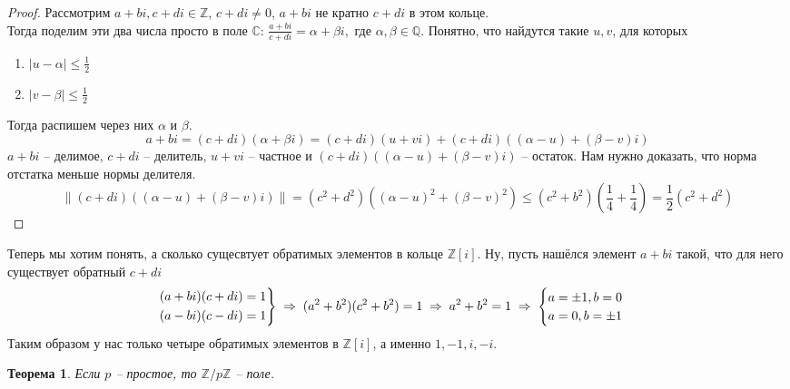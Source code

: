 \documentclass[12pt, a4paper]{article}
\newcommand{\qu}{\mathds{Q}}
\newcommand{\ra}{\;\Rightarrow\;}
\newcommand{\ce}{\mathds{C}}
\newcommand{\Z}{\mathds{Z}}
\newcommand{\m}{\leqslant}
\newcommand{\norm}[1]{\left \lVert #1 \right \rVert}
\theoremstyle{plain}
\newtheorem*{Th*}{Теорема}
\theoremstyle{definition}
\begin{document}
\begin{proof}
    Рассмотрим $a+bi,c+di\in\Z$, $c+di\neq 0$, $a+bi\text{ не кратно } c+di$ в этом кольце.\\
    Тогда поделим эти два числа просто в поле $\ce$: $\frac{a+bi}{c+di} = \alpha+\beta i,$ где $\alpha,\beta\in\qu$. Понятно, что найдутся такие $u,v$, для которых 
    \begin{enumerate}
        \item $|u-\alpha|\m \frac{1}{2}$
        \item $|v-\beta|\m \frac{1}{2}$
    \end{enumerate}
    Тогда распишем через них $\alpha$ и $\beta$.
    \[a+bi = (c+di)(\alpha+\beta i) = (c+di)(u+vi) + (c+di)((\alpha - u)+(\beta-v)i)\]
     $a+bi$ -- делимое, $c+di$ -- делитель, $u+vi$ -- частное и $(c+di)((\alpha - u)+(\beta-v)i)$ -- остаток.
     Нам нужно доказать, что норма отстатка меньше нормы делителя.
     \[\norm{(c+di)((\alpha - u)+(\beta-v)i)} = (c^2+d^2)((\alpha - u)^2+(\beta - v)^2)\m (c^2+b^2)(\frac{1}{4}+\frac{1}{4}) = \frac{1}{2}(c^2+d^2)\]
\end{proof}
\noindent Теперь мы хотим понять, а сколько сущесвтует обратимых элементов в кольце $\Z[i]$. Ну, пусть нашёлся элемент $a+bi$ такой, что для него существует обратный $c+di$
\begin{equation*}
    \begin{rcases}
      (a+bi)(c+di) = 1 \\
      (a-bi)(c-di) = 1
      \end{rcases}
\ra (a^2+b^2)(c^2+b^2) = 1 \ra a^2+b^2 = 1 \ra 
\begin{cases}
    a = \pm1, b=0\\
    a=0, b=\pm1
    \end{cases}
\end{equation*}
Таким образом у нас только четыре обратимых элементов в $\Z[i]$, а именно $1,-1,i,-i$.
\begin{Th*}
    Если $p$ -- простое, то $\Z/p\Z$ -- поле.
\end{Th*}
\end{document}
